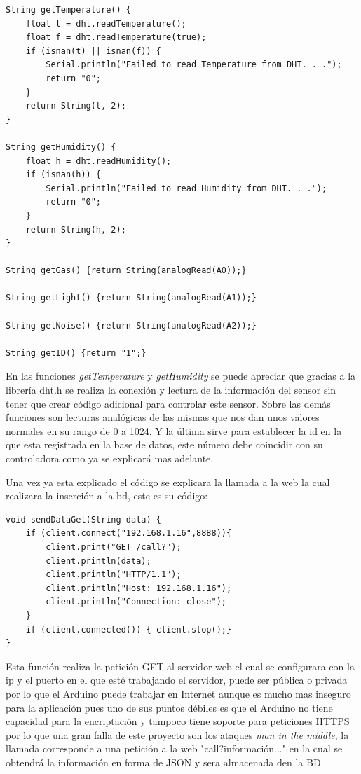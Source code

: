 \begin{lstlisting}[caption=Funciones de recogida de datos, label=datelcom]
String getTemperature() {
	float t = dht.readTemperature();
	float f = dht.readTemperature(true);
	if (isnan(t) || isnan(f)) {
		Serial.println("Failed to read Temperature from DHT. . .");
		return "0";
	}
	return String(t, 2);
}

String getHumidity() {
	float h = dht.readHumidity();
	if (isnan(h)) {
		Serial.println("Failed to read Humidity from DHT. . .");
		return "0";
	}
	return String(h, 2);
}

String getGas() {return String(analogRead(A0));}

String getLight() {return String(analogRead(A1));}

String getNoise() {return String(analogRead(A2));}

String getID() {return "1";}
\end{lstlisting}

En las funciones \textit{getTemperature} y \textit{getHumidity} se puede apreciar que gracias a la librería dht.h se realiza la conexión y lectura de la información del sensor sin tener que crear código adicional para controlar este sensor. Sobre las demás funciones son lecturas analógicas de las mismas que nos dan unos valores normales en su rango de 0 a 1024. Y la última sirve para establecer la id en la que esta registrada en la base de datos, este número debe coincidir con su controladora como ya se explicará mas adelante.

Una vez ya esta explicado el código se explicara la llamada a la web la cual realizara la inserción a la bd, este es su código:

\begin{lstlisting}[caption=Función de comunicación con el servidor, label=comunicacion]
void sendDataGet(String data) {
	if (client.connect("192.168.1.16",8888)){
		client.print("GET /call?");
		client.println(data);
		client.println("HTTP/1.1");
		client.println("Host: 192.168.1.16");        
		client.println("Connection: close");
	}
	if (client.connected()) { client.stop();}
}
\end{lstlisting}


Esta función realiza la petición GET al servidor web el cual se configurara con la ip y el puerto en el que esté trabajando el servidor, puede ser pública o privada por lo que el Arduino puede trabajar en Internet aunque es mucho mas inseguro para la aplicación pues uno de sus puntos débiles es que el Arduino no tiene capacidad para la encriptación y tampoco tiene soporte para peticiones HTTPS por lo que una gran falla de este proyecto son los ataques \textit{man in the middle}, la llamada corresponde a una petición a la web "call?información..." en la cual se obtendrá la información en forma de JSON y sera almacenada den la BD.


